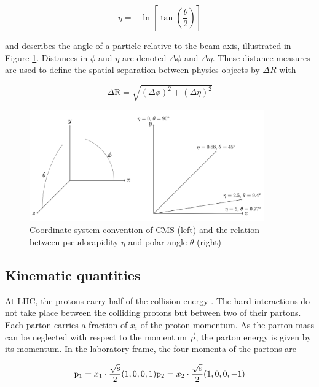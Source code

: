 \begin{equation}
  \eta=-\ln \left[\tan \left(\frac{\theta}{2}\right)\right]
\end{equation}

and describes the angle of a particle relative to the beam axis, illustrated in Figure \ref{fig:coordinate}. Distances in $\phi$ and $\eta$ are denoted $\Delta\phi$ and $\Delta\eta$. These distance measures are used to define the spatial separation between physics objects by $\Delta R$ with

\begin{equation}
  \Delta \mathrm{R}=\sqrt{(\Delta \phi)^{2}+(\Delta \eta)^{2}}
\end{equation}

\begin{figure}[htbp]
  \centering
  \includegraphics[width=0.9\textwidth]{plots/chapter3/coordinate.png}
  \caption{Coordinate system convention of CMS (left) and the relation between pseudorapidity $\eta$ and polar angle $\theta$ (right)}
  \label{fig:coordinate}
\end{figure}

\subsection{Kinematic quantities}
At LHC, the protons carry half of the collision energy \sqs. The hard interactions do not take place between the colliding protons but between two of their partons. Each parton carries a fraction of $x_i$ of the proton momentum. As the parton mass can be neglected with respect to the momentum $\vec{p}$, the parton energy is given by its momentum. In the laboratory frame, the four-momenta of the partons are

\begin{equation}
  \mathrm{p}_{1}=x_{1} \cdot \frac{\sqrt{\text{s}}}{2}(1,0,0,1) \\
  \mathrm{p}_{2}=x_{2} \cdot \frac{\sqrt{\text{s}}}{2}(1,0,0,-1)
\end{equation}

